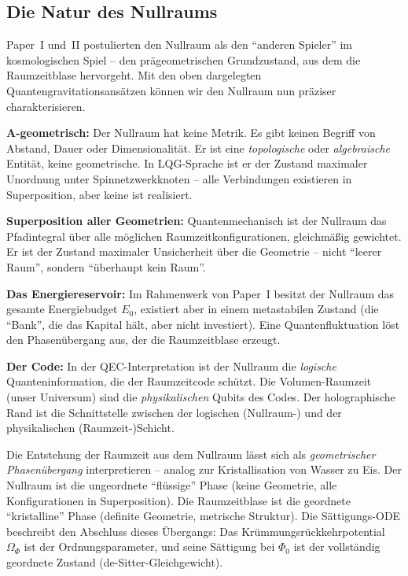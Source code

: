 \documentclass[11pt,a4paper]{article}
\begin{document}
\subsection{Die Natur des Nullraums}
\label{subsec:null_space}

Paper~I und~II postulierten den Nullraum als den "`anderen Spieler"' im kosmologischen Spiel -- den pr\"ageometrischen Grundzustand, aus dem die Raumzeitblase hervorgeht. Mit den oben dargelegten Quantengravitationsans\"atzen k\"onnen wir den Nullraum nun pr\"aziser charakterisieren.

\textbf{A-geometrisch:} Der Nullraum hat keine Metrik. Es gibt keinen Begriff von Abstand, Dauer oder Dimensionalit\"at. Er ist eine \textit{topologische} oder \textit{algebraische} Entit\"at, keine geometrische. In LQG-Sprache ist er der Zustand maximaler Unordnung unter Spinnetzwerkknoten -- alle Verbindungen existieren in Superposition, aber keine ist realisiert.

\textbf{Superposition aller Geometrien:} Quantenmechanisch ist der Nullraum das Pfadintegral \cite{Feynman1948} \"uber alle m\"oglichen Raumzeitkonfigurationen, gleichm\"a\ss ig gewichtet. Er ist der Zustand maximaler Unsicherheit \"uber die Geometrie -- nicht "`leerer Raum"', sondern "`\"uberhaupt kein Raum"'.

\textbf{Das Energiereservoir:} Im Rahmenwerk von Paper~I besitzt der Nullraum das gesamte Energiebudget $E_0$, existiert aber in einem metastabilen Zustand (die "`Bank"', die das Kapital h\"alt, aber nicht investiert). Eine Quantenfluktuation l\"ost den Phasen\"ubergang aus, der die Raumzeitblase erzeugt.

\textbf{Der Code:} In der QEC-Interpretation ist der Nullraum die \textit{logische} Quanteninformation, die der Raumzeitcode sch\"utzt. Die Volumen-Raumzeit (unser Universum) sind die \textit{physikalischen} Qubits des Codes. Der holographische Rand ist die Schnittstelle zwischen der logischen (Nullraum-) und der physikalischen (Raumzeit-)Schicht.

Die Entstehung der Raumzeit aus dem Nullraum l\"asst sich als \textit{geometrischer Phasen\"ubergang} interpretieren -- analog zur Kristallisation von Wasser zu Eis. Der Nullraum ist die ungeordnete "`fl\"ussige"' Phase (keine Geometrie, alle Konfigurationen in Superposition). Die Raumzeitblase ist die geordnete "`kristalline"' Phase (definite Geometrie, metrische Struktur). Die S\"attigungs-ODE beschreibt den Abschluss dieses \"Ubergangs: Das Kr\"ummungsr\"uckkehrpotential $\Omega_\Phi$ ist der Ordnungsparameter, und seine S\"attigung bei $\Phi_0$ ist der vollst\"andig geordnete Zustand (de-Sitter-Gleichgewicht).
\end{document}
